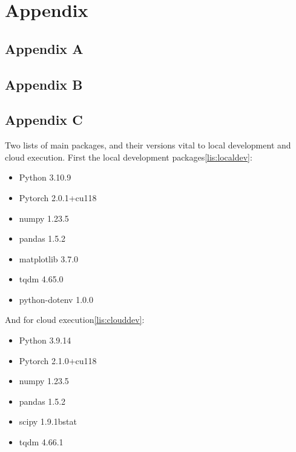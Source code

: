 \section{Appendix}\label{sec:appendix}

\subsection{Appendix A}\label{subsec:appendixA}


\subsection{Appendix B}\label{subsec:appendixB}



\subsection{Appendix C}\label{subsec:appendixC}

Two lists of main packages, and their versions vital to local development and cloud execution.
First the local development packages\ref{lis:localdev}:

\begin{itemize}\label{lis:localdev}
    \item Python 3.10.9
    \item Pytorch 2.0.1+cu118
    \item numpy 1.23.5
    \item pandas 1.5.2
    \item matplotlib 3.7.0
    \item tqdm 4.65.0
    \item python-dotenv 1.0.0
\end{itemize}

And for cloud execution\ref{lis:clouddev}:

\begin{itemize}\label{lis:clouddev}
    \item Python 3.9.14
    \item Pytorch 2.1.0+cu118
    \item numpy 1.23.5
    \item pandas 1.5.2
    \item scipy 1.9.1bstat
    \item tqdm 4.66.1
\end{itemize}